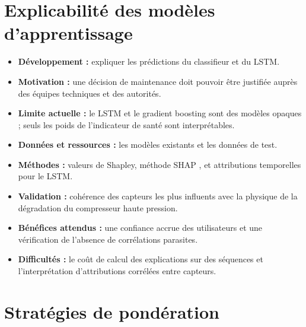 \section{Explicabilité des modèles d'apprentissage}\label{sec:p-xai}

\begin{itemize}
\item \textbf{Développement :} expliquer les prédictions du classifieur et du LSTM.
\item \textbf{Motivation :} une décision de maintenance doit pouvoir être justifiée auprès des équipes techniques et des autorités.
\item \textbf{Limite actuelle :} le LSTM et le gradient boosting sont des modèles opaques ; seuls les poids de l'indicateur de santé sont interprétables.
\item \textbf{Données et ressources :} les modèles existants et les données de test.
\item \textbf{Méthodes :} valeurs de Shapley, méthode SHAP \cite{lundberg2017}, et attributions temporelles pour le LSTM.
\item \textbf{Validation :} cohérence des capteurs les plus influents avec la physique de la dégradation du compresseur haute pression.
\item \textbf{Bénéfices attendus :} une confiance accrue des utilisateurs et une vérification de l'absence de corrélations parasites.
\item \textbf{Difficultés :} le coût de calcul des explications sur des séquences et l'interprétation d'attributions corrélées entre capteurs.
\end{itemize}

\section{Stratégies de pondération}\label{sec:p-ponderation}

